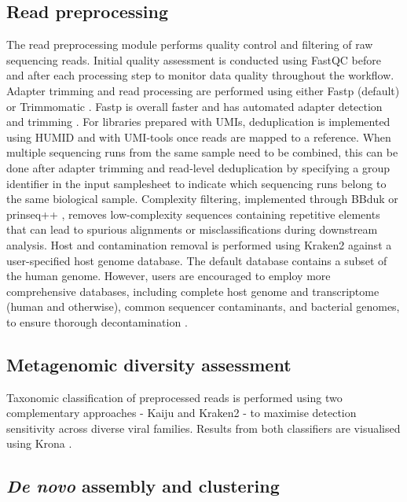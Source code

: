 \subsection{Read preprocessing}

The read preprocessing module performs quality control and filtering of raw sequencing reads. Initial quality assessment is conducted using FastQC before and after each processing step to monitor data quality throughout the workflow. Adapter trimming and read processing are performed using either Fastp \cite{Chen2018-tu} (default) or Trimmomatic \cite{Bolger2014-si}. Fastp is overall faster and has automated adapter detection and trimming \cite{Chen2018-tu}. For libraries prepared with UMIs, deduplication is implemented using HUMID \cite{LarosUnknown-nx} and with UMI-tools \cite{Smith2017-nk} once reads are mapped to a reference. When multiple sequencing runs from the same sample need to be combined, this can be done after adapter trimming and read-level deduplication by specifying a group identifier in the input samplesheet to indicate which sequencing runs belong to the same biological sample. Complexity filtering, implemented through BBduk \cite{BushnellUnknown-qy} or prinseq++ \cite{Cantu2019-vs}, removes low-complexity sequences containing repetitive elements that can lead to spurious alignments or misclassifications during downstream analysis. Host and contamination removal is performed using Kraken2 \cite{Wood2019-jl} against a user-specified host genome database. The default database contains a subset of the human genome. However, users are encouraged to employ more comprehensive databases, including complete host genome and transcriptome (human and otherwise), common sequencer contaminants, and bacterial genomes, to ensure thorough decontamination \cite{Forbes2025-mv}.

\subsection{Metagenomic diversity assessment}

Taxonomic classification of preprocessed reads is performed using two complementary approaches - Kaiju \cite{Menzel2016-tz} and Kraken2 \cite{Wood2019-jl} - to maximise detection sensitivity across diverse viral families. Results from both classifiers are visualised using Krona \cite{Ondov2011-yp}.

\subsection{{\it De novo} assembly and clustering}

